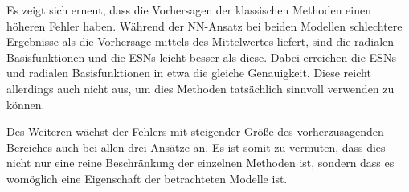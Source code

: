 Es zeigt sich erneut, dass die Vorhersagen der klassischen Methoden einen höheren Fehler haben. Während der \textsc{NN}-Ansatz bei beiden Modellen schlechtere Ergebnisse als die Vorhersage mittels des Mittelwertes liefert, sind die radialen Basisfunktionen und die \textsc{ESN}s leicht besser als diese. Dabei erreichen die \textsc{ESN}s und radialen Basisfunktionen in etwa die gleiche Genauigkeit. Diese reicht allerdings auch nicht aus, um dies Methoden tatsächlich sinnvoll verwenden zu können. 

Des Weiteren wächst der Fehlers mit steigender Größe des vorherzusagenden Bereiches auch bei allen drei Ansätze an. Es ist somit zu vermuten, dass dies nicht nur eine reine Beschränkung der einzelnen Methoden ist, sondern dass es womöglich eine Eigenschaft der betrachteten Modelle ist. 

